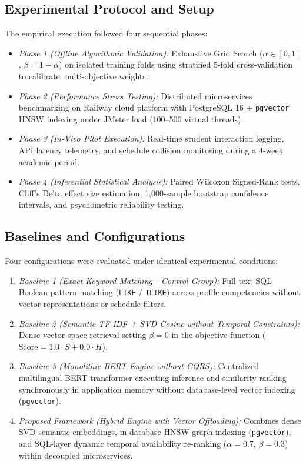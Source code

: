 \documentclass[a4paper,fleqn]{cas-dc}
\begin{document}
\subsection{Experimental Protocol and Setup}
The empirical execution followed four sequential phases:
\begin{itemize}
    \item \textit{Phase 1 (Offline Algorithmic Validation):} Exhaustive Grid Search ($\alpha \in [0, 1]$, $\beta = 1 - \alpha$) on isolated training folds using stratified 5-fold cross-validation to calibrate multi-objective weights.
    \item \textit{Phase 2 (Performance Stress Testing):} Distributed microservices benchmarking on Railway cloud platform with PostgreSQL 16 + \texttt{pgvector} HNSW indexing under JMeter load (100--500 virtual threads).
    \item \textit{Phase 3 (In-Vivo Pilot Execution):} Real-time student interaction logging, API latency telemetry, and schedule collision monitoring during a 4-week academic period.
    \item \textit{Phase 4 (Inferential Statistical Analysis):} Paired Wilcoxon Signed-Rank tests, Cliff's Delta effect size estimation, 1,000-sample bootstrap confidence intervals, and psychometric reliability testing.
\end{itemize}

\subsection{Baselines and Configurations}
Four configurations were evaluated under identical experimental conditions:
\begin{enumerate}
    \item \textit{Baseline 1 (Exact Keyword Matching - Control Group):} Full-text SQL Boolean pattern matching (\texttt{LIKE} / \texttt{ILIKE}) across profile competencies without vector representations or schedule filters.
    \item \textit{Baseline 2 (Semantic TF-IDF + SVD Cosine without Temporal Constraints):} Dense vector space retrieval \cite{alsaif2022, koren2009} setting $\beta = 0$ in the objective function ($\text{Score} = 1.0 \cdot S + 0.0 \cdot H$).
    \item \textit{Baseline 3 (Monolithic BERT Engine without CQRS):} Centralized multilingual BERT transformer executing inference and similarity ranking synchronously in application memory without database-level vector indexing (\texttt{pgvector}).
    \item \textit{Proposed Framework (Hybrid Engine with Vector Offloading):} Combines dense SVD semantic embeddings, in-database HNSW graph indexing (\texttt{pgvector}), and SQL-layer dynamic temporal availability re-ranking ($\alpha = 0.7$, $\beta = 0.3$) within decoupled microservices.
\end{enumerate}
\end{document}
